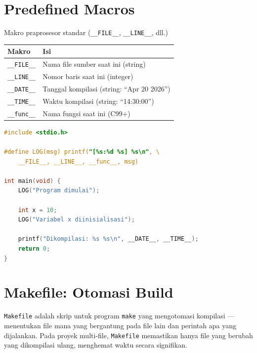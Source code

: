 \documentclass[../main.tex]{subfiles}
\begin{document}
\section{Predefined Macros}

\begin{modultable}[]{Makro praprosesor standar (\texttt{\_\_FILE\_\_}, \texttt{\_\_LINE\_\_}, dll.)}
\begin{tabular}{|l|p{8cm}|}
\hline
\textbf{Makro} & \textbf{Isi} \\
\hline
\texttt{\_\_FILE\_\_} & Nama file sumber saat ini (string) \\
\hline
\texttt{\_\_LINE\_\_} & Nomor baris saat ini (integer) \\
\hline
\texttt{\_\_DATE\_\_} & Tanggal kompilasi (string: ``Apr 20 2026'') \\
\hline
\texttt{\_\_TIME\_\_} & Waktu kompilasi (string: ``14:30:00'') \\
\hline
\texttt{\_\_func\_\_} & Nama fungsi saat ini (C99+) \\
\hline
\end{tabular}
\end{modultable}

\begin{lstlisting}[language=C,caption=Menggunakan predefined macros untuk log]
#include <stdio.h>

#define LOG(msg) printf("[%s:%d %s] %s\n", \
    __FILE__, __LINE__, __func__, msg)

int main(void) {
    LOG("Program dimulai");
    
    int x = 10;
    LOG("Variabel x diinisialisasi");
    
    printf("Dikompilasi: %s %s\n", __DATE__, __TIME__);
    return 0;
}
\end{lstlisting}

\section{Makefile: Otomasi Build}

\texttt{Makefile} adalah skrip untuk program \texttt{make} yang mengotomasi kompilasi --- menentukan file mana yang bergantung pada file lain dan perintah apa yang dijalankan. Pada proyek multi-file, \texttt{Makefile} memastikan hanya file yang berubah yang dikompilasi ulang, menghemat waktu secara signifikan.
\end{document}
